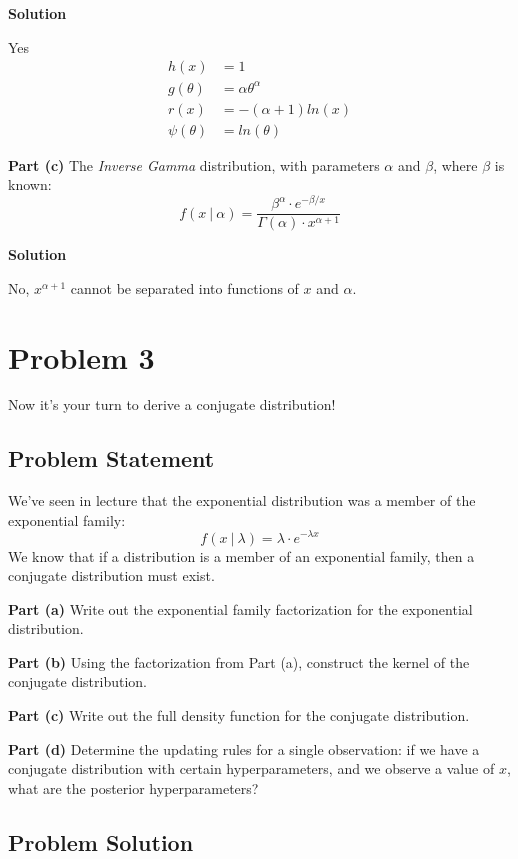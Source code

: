 \documentclass[12pt]{article}
\theoremstyle{definition}
\begin{document}
\bigskip
\noindent
{\bf Solution}

Yes
\begin{align*}
h(x) &= 1\\
g(\theta) &= \alpha\theta^\alpha\\
r(x) &= -(\alpha + 1)ln(x)\\
\psi(\theta) &= ln(\theta)
\end{align*}

\vspace{0.5in}
\noindent
{\bf Part (c)} The {\em Inverse Gamma} distribution, with parameters $\alpha$ and $\beta$, where $\beta$ is known:
$$
f(x\ |\ \alpha) = \frac{ \beta^\alpha \cdot e^{-\beta/x} }{\Gamma(\alpha) \cdot x^{\alpha + 1} }
$$

\bigskip
\noindent
{\bf Solution}

No, $x^{\alpha + 1}$ cannot be separated into functions of $x$ and $\alpha$.

\newpage
\section*{Problem 3}

Now it's your turn to derive a conjugate distribution!

\subsection*{Problem Statement}

We've seen in lecture that the exponential distribution was a member of the exponential family:
$$
f(x\ |\ \lambda) = \lambda \cdot e^{-\lambda x}
$$
We know that if a distribution is a member of an exponential family, then a conjugate distribution must exist.

\bigskip
\noindent
{\bf Part (a)} Write out the exponential family factorization for the exponential distribution.

\bigskip
\noindent
{\bf Part (b)} Using the factorization from Part (a), construct the kernel of the conjugate distribution.

\bigskip
\noindent
{\bf Part (c)} Write out the full density function for the conjugate distribution.


\bigskip
\noindent
{\bf Part (d)} Determine the updating rules for a single observation: if we have a conjugate distribution with certain hyperparameters, and we observe a value of $x$, what are the posterior hyperparameters? 


\subsection*{Problem Solution}
\end{document}
